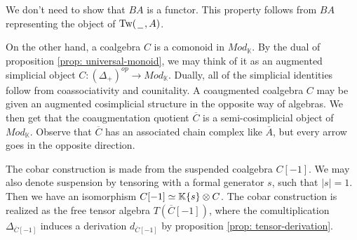 \documentclass[../thesis.tex]{subfiles}
\begin{document}
            \begin{remark}
                We don't need to show that $BA$ is a functor. This property follows from $BA$ representing the object of $\text{Tw}(\hspace{0.05cm}\underline{\hspace{0.2cm}}\hspace{0.05cm}, A)$.
            \end{remark}

            On the other hand, a coalgebra $C$ is a comonoid in $Mod_\mathbb{K}$. By the dual of proposition \ref{prop: universal-monoid}, we may think of it as an augmented simplicial object $C:(\Delta_+)^{op} \rightarrow Mod_\mathbb{K}$. Dually, all of the simplicial identities follow from coassociativity and counitality. A coaugmented coalgebra $C$ may be given an augmented cosimplicial structure in the opposite way of algebras. We then get that the coaugmentation quotient $\overline{C}$ is a semi-cosimplicial object of $Mod_\mathbb{K}$. Observe that $\overline{C}$ has an associated chain complex like $\overline{A}$, but every arrow goes in the opposite direction.

            \begin{center}

            \end{center}
            
            The cobar construction is made from the suspended coalgebra $C[-1]$. We may also denote suspension by tensoring with a formal generator $s$, such that $|s| = 1$. Then we have an isomorphism $C[-1] \simeq \mathbb{K}\{s\}\otimes C$. The cobar construction is realized as the free tensor algebra $T(\overline{C}[-1])$, where the comultiplication $\Delta_{\overline{C}[-1]}$ induces a derivation $d_{\overline{C}[-1]}$ by proposition \ref{prop: tensor-derivation}.
\end{document}
